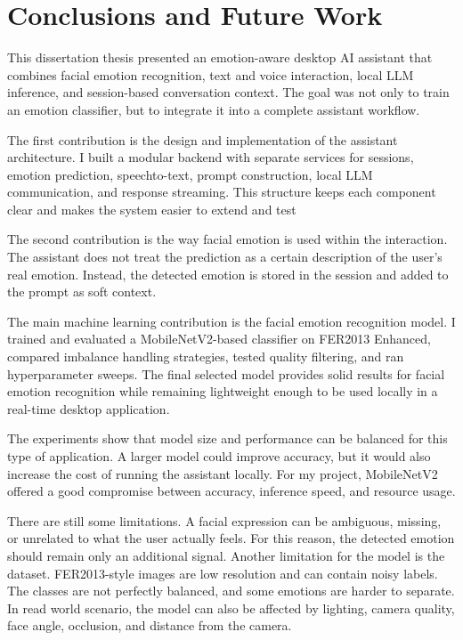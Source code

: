 \chapter{Conclusions and Future Work}

This dissertation thesis presented an emotion-aware desktop AI assistant that combines facial emotion recognition, text and voice interaction, local LLM inference, and session-based conversation context. The goal was not only to train an emotion classifier, but to integrate it into a complete assistant workflow.

The first contribution is the design and implementation of the assistant architecture. I built a modular backend with separate services for sessions, emotion prediction, speechto-text, prompt construction, local LLM communication, and response streaming. This structure keeps each component clear and makes the system easier to extend and test

The second contribution is the way facial emotion is used within the interaction. The assistant does not treat the prediction as a certain description of the user's real emotion. Instead, the detected emotion is stored in the session and added to the prompt as soft context.

The main machine learning contribution is the facial emotion recognition model. I trained and evaluated a MobileNetV2-based classifier on FER2013 Enhanced, compared imbalance handling strategies, tested quality filtering, and ran hyperparameter sweeps. The final selected model provides solid results for facial emotion recognition while remaining lightweight enough to be used locally in a real-time desktop application.

The experiments show that model size and performance can be balanced for this type of application. A larger model could improve accuracy, but it would also increase the cost of running the assistant locally. For my project, MobileNetV2 offered a good compromise between accuracy, inference speed, and resource usage.

There are still some limitations. A facial expression can be ambiguous, missing, or unrelated to what the user actually feels. For this reason, the detected emotion should remain only an additional signal. Another limitation for the model is the dataset. FER2013-style images are low resolution and can contain noisy labels. The classes are not perfectly balanced, and some emotions are harder to separate. In read world scenario, the model can also be affected by lighting, camera quality, face angle, occlusion, and distance from the camera.

